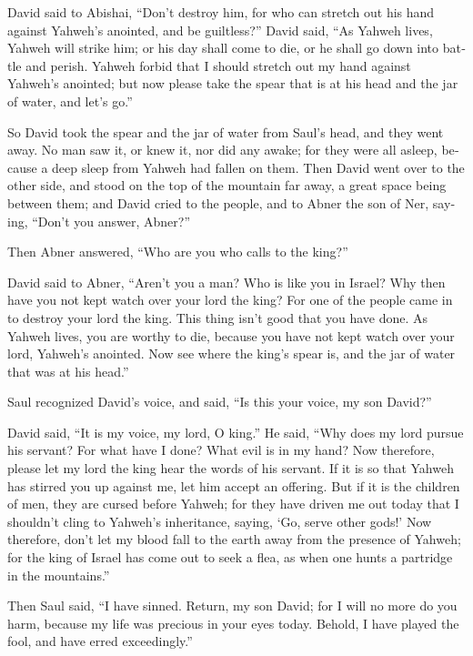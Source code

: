 \begin{paracol}{2}
\begin{otherlanguage}{english}
 David said to Abishai, ``Don't destroy him, for who can
stretch out his hand against Yahweh's anointed, and be guiltless?''
 David said, ``As Yahweh lives, Yahweh will strike him;
or his day shall come to die, or he shall go down into battle and
perish.  Yahweh forbid that I should stretch out my hand
against Yahweh's anointed; but now please take the spear that is at his
head and the jar of water, and let's go.''

 So David took the spear and the jar of water from Saul's
head, and they went away. No man saw it, or knew it, nor did any awake;
for they were all asleep, because a deep sleep from Yahweh had fallen on
them.  Then David went over to the other side, and stood
on the top of the mountain far away, a great space being between them;
 and David cried to the people, and to Abner the son of
Ner, saying, ``Don't you answer, Abner?''

Then Abner answered, ``Who are you who calls to the king?''

 David said to Abner, ``Aren't you a man? Who is like you
in Israel? Why then have you not kept watch over your lord the king? For
one of the people came in to destroy your lord the king. 
This thing isn't good that you have done. As Yahweh lives, you are
worthy to die, because you have not kept watch over your lord, Yahweh's
anointed. Now see where the king's spear is, and the jar of water that
was at his head.''

 Saul recognized David's voice, and said, ``Is this your
voice, my son David?''

David said, ``It is my voice, my lord, O king.''  He
said, ``Why does my lord pursue his servant? For what have I done? What
evil is in my hand?  Now therefore, please let my lord
the king hear the words of his servant. If it is so that Yahweh has
stirred you up against me, let him accept an offering. But if it is the
children of men, they are cursed before Yahweh; for they have driven me
out today that I shouldn't cling to Yahweh's inheritance, saying, `Go,
serve other gods!'  Now therefore, don't let my blood
fall to the earth away from the presence of Yahweh; for the king of
Israel has come out to seek a flea, as when one hunts a partridge in the
mountains.''

 Then Saul said, ``I have sinned. Return, my son David;
for I will no more do you harm, because my life was precious in your
eyes today. Behold, I have played the fool, and have erred
exceedingly.''


\end{otherlanguage}
\end{paracol}
